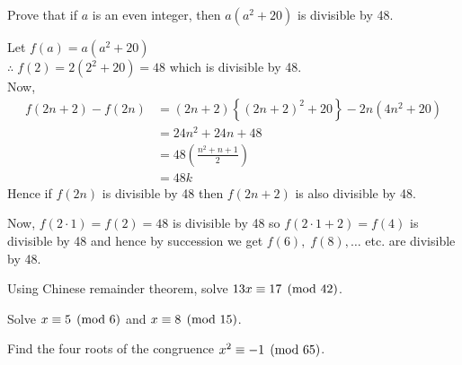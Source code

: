 \documentclass[12pt,class=book,crop=false]{standalone}
\begin{document}
\begin{qn}
    Prove that if $ a $ is an even integer, then $ a(a^2+20) $ is divisible by 48.
\end{qn}
\begin{soln}
    Let $ f(a)=a(a^2+20) $\\
    $ \therefore\; f(2)=2(2^2+20)=48 $ which is divisible by 48.\\
    Now,
    \begin{align*}
        f(2n+2)-f(2n)&=(2n+2)\left\{ (2n+2)^2+20 \right\}-2n\left( 4n^2+20 \right)\\
        &=24n^2+24n+48\\
        &=48\left( \frac{n^2+n+1}{2}\right)\\
        &=48k
    \end{align*}
    Hence if $ f(2n) $ is divisible by 48 then $ f(2n+2) $ is also divisible by 48.

    Now, $ f(2\cdot1) =f(2)=48$ is divisible by 48 so $ f(2\cdot1+2)=f(4) $ is divisible by 48 and hence by succession we get $ f(6),\;f(8),\dots $ etc. are divisible by 48.
\end{soln}
\begin{qn}
    Using Chinese remainder theorem, solve $ 13x\equiv 17 \pmod{42} $.
\end{qn}
\begin{qn}
    Solve $ x\equiv 5 \pmod{6} $ and $ x\equiv 8 \pmod{15} $.
\end{qn}
\begin{qn}
    Find the four roots of the congruence $ x^2\equiv -1 \pmod{65} $.
\end{qn}
\end{document}
